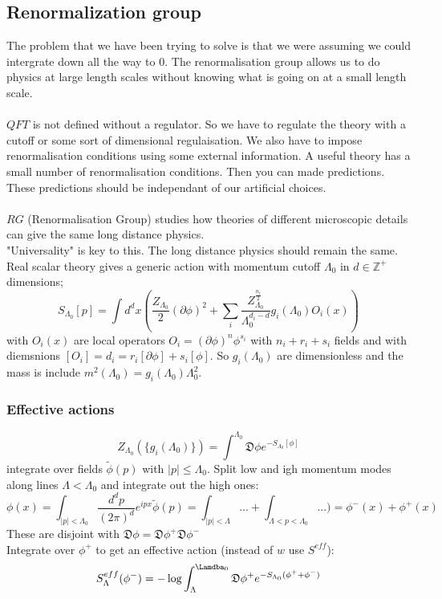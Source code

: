 \documentclass{article}
\begin{document}
\subsection{Renormalization group}
The problem that we have been trying to solve is that we were assuming we could intergrate down all the way to $0$. The renormalisation group allows us to do physics at large length scales without knowing what is going on at a small length scale. \\\\$QFT$ is not defined without a regulator. So we have to regulate the theory with a cutoff or some sort of dimensional regulaisation. We also have to impose renormalisation conditions using some external information. A useful theory has a small number of renormalisation conditions. Then you can made predictions. These predictions should be independant of our artificial choices. \\\\
$RG$ (Renormalisation Group) studies how theories of different microscopic details can give the same long distance physics.\\
"Universality" is key to this. The long distance physics should remain the same.\\
Real scalar theory gives a generic action with momentum cutoff $\Lambda_0$  in $d \in \mathbb{Z}^+$ dimensions;
$$
S_{\Lambda_0}[p] = \int d^d x (\frac{Z_{\Lambda_0}}{2} (\partial \phi)^2 + \sum_i \frac{ Z_{\Lambda_0}^{\frac{n_i}{2}}}{\Lambda_{0}^{d_i - d}} g_i( \Lambda_0) O_i(x))
$$
with $O_i(x)$ are local operators $O_i = ( \partial \phi)^n \phi^{s_i}$ with $n_i + r_i + s_i$ fields and with diemsnions $[O_i] = d_i= r_i [ \partial \phi] + s_i [\phi]$. So $g_i( \Lambda_0)$ are dimensionless and the mass is include $m^2 ( \Lambda_0) = g_i (\Lambda_0) \Lambda_0^2$.
\subsubsection{Effective actions}
$$
Z_{\Lambda_0} (\{ g_i (\Lambda_0)\}) = \int^{\Lambda_0} \mathfrak{D} \phi e^{- S_{\Lambda_0}[\phi]}
$$
integrate over fields $\tilde \phi(p)$ with $|p| \leq \Lambda_0$. Split low and igh momentum modes along lines $\Lambda < \Lambda_0$ and integrate out the high ones:
$$
\phi(x) = \int_{|p| < \Lambda_0} \frac{d^d p}{(2\pi)^d} e^{i p x} \tilde \phi(p) = \int_{|p| < \Lambda}...  +  \int_{\Lambda < p < \Lambda_0} ...) = \phi^-(x) + \phi^+ (x)
$$
These are disjoint with $\mathfrak{D} \phi = \mathfrak{D} \phi^+ \mathfrak{D} \phi^-$\\
Integrate over $\phi^+$ to get an effective action (instead of $w$ use $S^{eff}$):
$$
S_{\Lambda}^{eff} ( \phi^-) = - \log \int_{\Lambda}^{\Lamdba_0} \mathfrak{D} \phi^+ e^{- S_{\Lambda_0} (\phi^+ + \phi^-)}
$$
\end{document}
